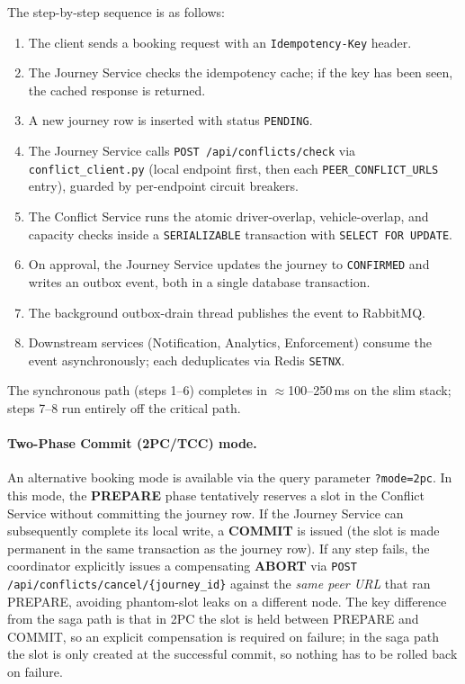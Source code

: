 \documentclass[11pt,a4paper]{article}
\begin{document}
The step-by-step sequence is as follows:

\begin{enumerate}
    \item The client sends a booking request with an \texttt{Idempotency-Key} header.
    \item The Journey Service checks the idempotency cache; if the key has been seen, the cached response is returned.
    \item A new journey row is inserted with status \texttt{PENDING}.
    \item The Journey Service calls \texttt{POST /api/conflicts/check} via \texttt{conflict\_client.py} (local endpoint first, then each \texttt{PEER\_CONFLICT\_URLS} entry), guarded by per-endpoint circuit breakers.
    \item The Conflict Service runs the atomic driver-overlap, vehicle-overlap, and capacity checks inside a \texttt{SERIALIZABLE} transaction with \texttt{SELECT FOR UPDATE}.
    \item On approval, the Journey Service updates the journey to \texttt{CONFIRMED} and writes an outbox event, both in a single database transaction.
    \item The background outbox-drain thread publishes the event to RabbitMQ.
    \item Downstream services (Notification, Analytics, Enforcement) consume the event asynchronously; each deduplicates via Redis \texttt{SETNX}.
\end{enumerate}

The synchronous path (steps 1--6) completes in $\approx$100--250\,ms on the slim stack; steps 7--8 run entirely off the critical path.

\paragraph{Two-Phase Commit (2PC/TCC) mode.}
An alternative booking mode is available via the query parameter \texttt{?mode=2pc}. In this mode, the \textbf{PREPARE} phase tentatively reserves a slot in the Conflict Service without committing the journey row. If the Journey Service can subsequently complete its local write, a \textbf{COMMIT} is issued (the slot is made permanent in the same transaction as the journey row). If any step fails, the coordinator explicitly issues a compensating \textbf{ABORT} via \texttt{POST /api/conflicts/cancel/\{journey\_id\}} against the \emph{same peer URL} that ran PREPARE, avoiding phantom-slot leaks on a different node. The key difference from the saga path is that in 2PC the slot is held between PREPARE and COMMIT, so an explicit compensation is required on failure; in the saga path the slot is only created at the successful commit, so nothing has to be rolled back on failure.
\end{document}
